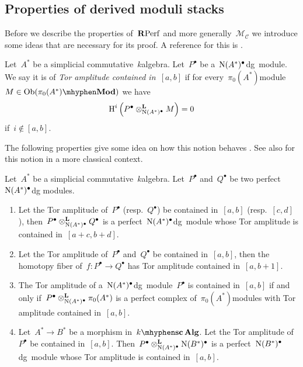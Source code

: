 \begin{refsection}
\section{Properties of derived moduli stacks}
\label{section:properties}
Before we describe the properties of~$\mathbf{R}\mathrm{Perf}$ and more generally~$\mathcal{M}_{\mathcal{C}}$ we introduce some ideas that are necessary for its proof. A reference for this is \cite[expos\'es I--III]{sga6}.
\begin{definition}
  Let~$A^*$ be a simplicial commutative~$k$\dash algebra. Let~$P^\bullet$ be a~$\operatorname{N}(A^*)^\bullet$\dash dg~module. We say it is of \emph{Tor amplitude contained in~$[a,b]$} if for every~$\pi_0(A^*)$\dash module~$M\in\Ob(\pi_0(A^*)\mhyphen\Mod)$ we have
  \begin{equation}
    \operatorname{H}^i\left( P^\bullet\otimes_{\operatorname{N}(A^*)^\bullet}^{\mathbf{L}} M \right)=0
  \end{equation}
  if~$i\notin[a,b]$.
\end{definition}
The following properties give some idea on how this notion behaves \cite[proposition 2.22]{toen-vaquie}. See also \cite[\href{http://stacks.math.columbia.edu/tag/0651}{tag 0651}]{stacks} for this notion in a more classical context.
\begin{proposition}
  \label{proposition:Tor-amplitude}
  Let~$A^*$ be a simplicial commutative~$k$\dash algebra. Let~$P^\bullet$ and~$Q^\bullet$ be two perfect~$\operatorname{N}(A^*)^\bullet$\dash dg modules.
  \begin{enumerate}
    \item\label{enumerate:Tor-amplitude-1} Let the Tor amplitude of~$P^\bullet$ (resp.\ $Q^\bullet$) be contained in~$[a,b]$ (resp.\ $[c,d]$), then~$P^\bullet\otimes_{\operatorname{N}(A^*)^\bullet}^{\mathbf{L}}Q^\bullet$ is a perfect~$\operatorname{N}(A^*)^\bullet$\dash dg~module whose Tor amplitude is contained in~$[a+c,b+d]$.
    \item\label{enumerate:Tor-amplitude-2} Let the Tor amplitude of~$P^\bullet$ and~$Q^\bullet$ be contained in~$[a,b]$, then the homotopy fiber of~$f\colon P^\bullet\to Q^\bullet$ has Tor amplitude contained in~$[a,b+1]$.
    \item\label{enumerate:Tor-amplitude-3} The Tor amplitude of a~$\operatorname{N}(A^*)^\bullet$\dash dg~module~$P^\bullet$ is contained in~$[a,b]$ if and only if~$P^\bullet\otimes_{\operatorname{N}(A^*)^\bullet}^{\mathbf{L}}\pi_0(A^*)$ is a perfect complex of~$\pi_0(A^*)$\dash modules with Tor amplitude contained in~$[a,b]$.
    \item\label{enumerate:Tor-amplitude-4} Let~$A^*\to B^*$ be a morphism in~$\scAlg{k}$. Let the Tor amplitude of~$P^\bullet$ be contained in~$[a,b]$. Then~$P^\bullet\otimes_{\operatorname{N}(A^*)^\bullet}^{\mathbf{L}}\operatorname{N}(B^*)^\bullet$ is a perfect~$\operatorname{N}(B^*)^\bullet$\dash dg~module whose Tor amplitude is contained in~$[a,b]$.

\end{enumerate}
\end{proposition}
\end{refsection}
